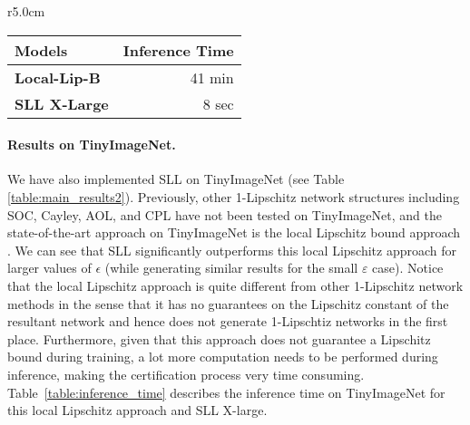 \documentclass{article} \usepackage{iclr2023_conference,times}
\newcommand{\0}{\mathbf{0} }
\begin{document}
\begin{wraptable}{r}{5.0cm}
    \centering
    \centering
    \vspace{-0.3cm}
    \caption{Inference time for Local-Lip-B and SLL X-Large on the full TinyImageNet validation with 4 GPUs.}
    \label{table:inference_time}
    {\footnotesize
    \begin{tabular}{lr}
    \toprule
    \textbf{Models} & \textbf{Inference Time} \\ 
    \midrule
    \textbf{Local-Lip-B} & 41 min \\
    \textbf{SLL X-Large} & 8 sec \\
    \bottomrule
    \end{tabular}}
\end{wraptable}

\vspace{-0.0cm}
\paragraph{Results on TinyImageNet.}
We have also implemented SLL on TinyImageNet (see Table \ref{table:main_results2}).
Previously, other 1-Lipschitz network structures including SOC, Cayley, AOL, and CPL have not been tested on TinyImageNet, and the state-of-the-art approach on TinyImageNet is the local Lipschitz bound approach \citep{huang2021local}.
We can see that SLL significantly outperforms this local Lipschitz approach for larger values of $\epsilon$ (while generating similar results for the small $\varepsilon$ case).
Notice that the local Lipschitz approach \citep{huang2021local} is quite different from other 1-Lipschitz network methods in the sense that it has no guarantees on the Lipschitz constant of the resultant network and hence does not generate 1-Lipschtiz networks in the first place.
Furthermore, given that this approach does not guarantee a Lipschitz bound during training, a lot more computation needs to be performed during inference, making the certification process very time consuming. 
Table~\ref{table:inference_time} describes the inference time on TinyImageNet for this local Lipschitz approach and SLL X-large. 
\end{document}
